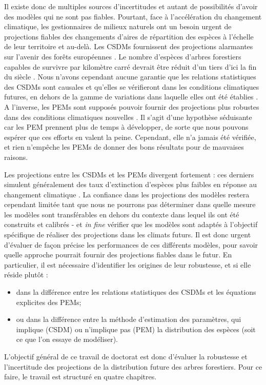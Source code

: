 Il existe donc de multiples sources d'incertitudes et autant de possibilités d'avoir des modèles qui ne sont pas fiables. Pourtant, face à l'accélération du changement climatique, les gestionnaires de milieux naturels ont un besoin urgent de projections fiables des changements d'aires de répartition des espèces à l'échelle de leur territoire et au-delà. Les CSDMs fournissent des projections alarmantes sur l'avenir des forêts européennes \citep{Thurm2018, Dyderski2018, Chakraborty2021, Wessely2024, Mauri2022}. Le nombre d'espèces d'arbres forestiers capables de survivre par kilomètre carré devrait être réduit d'un tiers d'ici la fin du siècle \citep{Wessely2024}. Nous n'avons cependant aucune garantie que les relations statistiques des CSDMs sont causales et qu'elles se vérifieront dans les conditions climatiques futures, en dehors de la gamme de variations dans laquelle elles ont été établies \citep{Maguire2016, Fitzpatrick2018}. 
A l'inverse, les PEMs sont supposés pouvoir fournir des projections plus robustes dans des conditions climatiques nouvelles \citep{Evans2012, Connolly2017, Urban2016, Pilowsky2022}. Il s'agit d'une hypothèse séduisante car les PEM prennent plus de temps à développer, de sorte que nous pouvons espérer que ces efforts en valent la peine. Cependant, elle n'a jamais été vérifiée, et rien n'empêche les PEMs de donner des bons résultats pour de mauvaises raisons.

Les projections entre les CSDMs et les PEMs divergent fortement : ces derniers simulent généralement des taux d'extinction d'espèces plus faibles en réponse au changement climatique \citep{Morin2009, Kearney2010, Cheaib2012, Gritti2013}. La confiance dans les projections des modèles restera cependant limitée tant que nous ne pourrons pas déterminer dans quelle mesure les modèles sont transférables en dehors du contexte dans lequel ils ont été construits et calibrés - et \emph{in fine} vérifier que les modèles sont adaptés à l'objectif spécifique de réaliser des projections dans les climats futurs. Il est donc urgent d'évaluer de façon précise les performances de ces différents modèles, pour savoir quelle approche pourrait fournir des projections fiables dans le futur. En particulier, il est nécessaire d'identifier les origines de leur robustesse, et si elle réside plutôt :
\begin{itemize}
\item dans la différence entre les relations statistiques des CSDMs et les équations explicites des PEMs;
\item ou dans la différence entre la méthode d'estimation des paramètres, qui implique (CSDM) ou n'implique pas (PEM) la distribution des espèces (soit  ce que l'on essaye de modéliser). 
\end{itemize}
L'objectif général de ce travail de doctorat est donc d'évaluer la robustesse et l'incertitude des projections de la distribution future des arbres forestiers. Pour ce faire, le travail est structuré en quatre chapitres.

